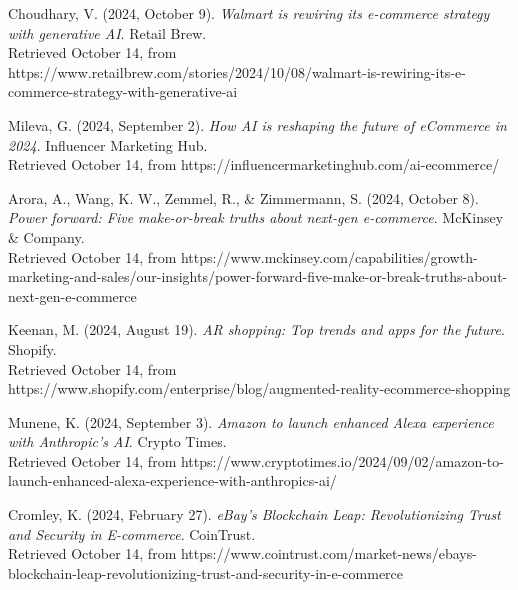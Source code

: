\documentclass[12pt]{ctexart}
\begin{document}
\begin{thebibliography}{99}
     Choudhary, V. (2024, October 9). \textit{Walmart is rewiring its e-commerce strategy with generative AI}. Retail Brew. \\ Retrieved October 14, from https://www.retailbrew.com/stories/2024/10/08/walmart-is-rewiring-its-e-commerce-strategy-with-generative-ai

     Mileva, G. (2024, September 2). \textit{How AI is reshaping the future of eCommerce in 2024}. Influencer Marketing Hub.  \\ Retrieved October 14, from https://influencermarketinghub.com/ai-ecommerce/

     Arora, A., Wang, K. W., Zemmel, R., \& Zimmermann, S. (2024, October 8). \textit{Power forward: Five make-or-break truths about next-gen e-commerce}. McKinsey \& Company. \\ Retrieved October 14, from https://www.mckinsey.com/capabilities/growth-marketing-and-sales/our-insights/power-forward-five-make-or-break-truths-about-next-gen-e-commerce

     Keenan, M. (2024, August 19). \textit{AR shopping: Top trends and apps for the future}. Shopify.  \\ Retrieved October 14, from https://www.shopify.com/enterprise/blog/augmented-reality-ecommerce-shopping

     Munene, K. (2024, September 3). \textit{Amazon to launch enhanced Alexa experience with Anthropic’s AI}. Crypto Times. \\ Retrieved October 14, from https://www.cryptotimes.io/2024/09/02/amazon-to-launch-enhanced-alexa-experience-with-anthropics-ai/

     Cromley, K. (2024, February 27). \textit{eBay’s Blockchain Leap: Revolutionizing Trust and Security in E-commerce}. CoinTrust. \\ Retrieved October 14, from https://www.cointrust.com/market-news/ebays-blockchain-leap-revolutionizing-trust-and-security-in-e-commerce
    
\end{thebibliography}


\end{document}
